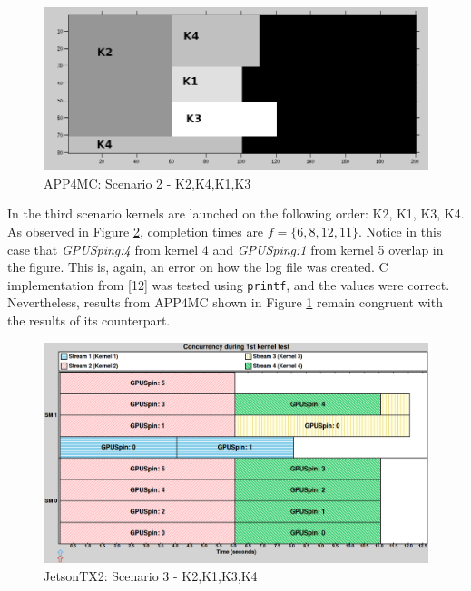 \documentclass[
  12pt,
  a4paperpaper,
]{report}
\begin{document}
\begin{figure}
\centering
\includegraphics[width=1\textwidth,height=\textheight]{source/figures/octave/ex02.png}
\caption{APP4MC: Scenario 2 - K2,K4,K1,K3 \label{img:octave-ex02}}
\end{figure}

In the third scenario kernels are launched on the following order: K2,
K1, K3, K4. As observed in Figure \ref{img:nvidia-ex05}, completion
times are \(f = \{6,8,12,11\}\). Notice in this case that
\emph{GPUSping:4} from kernel 4 and \emph{GPUSping:1} from kernel 5
overlap in the figure. This is, again, an error on how the log file was
created. C implementation from {[}12{]} was tested using \texttt{printf}, and
the values were correct. Nevertheless, results from APP4MC shown in
Figure \ref{img:octave-ex02} remain congruent with the results of its
counterpart.

\begin{figure}
\centering
\includegraphics[width=1\textwidth,height=\textheight]{source/figures/nvidia/ex05.png}
\caption{JetsonTX2: Scenario 3 - K2,K1,K3,K4 \label{img:nvidia-ex05}}
\end{figure}
\end{document}
